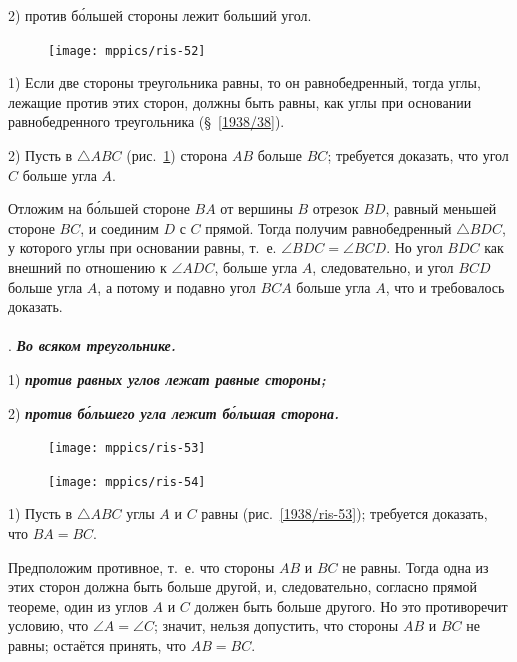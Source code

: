 \documentclass[oneside]{book}
\begin{document}
2) против б\'{о}льшей стороны лежит больший угол.


\begin{figure}
\centering
\texttt{[image: mppics/ris-52]}
\caption{}\label{1938/ris-52}
\end{figure}

1) Если две стороны треугольника равны, то он равнобедренный, тогда углы, лежащие против этих сторон, должны быть равны, как углы при основании равнобедренного треугольника (§~\ref{1938/38}).

2) Пусть в $\triangle ABC$ (рис.~\ref{1938/ris-52}) сторона $AB$ больше $BC$;
требуется доказать, что угол $C$ больше угла $A$.



Отложим на б\'{о}льшей стороне $BA$ от вершины $B$ отрезок $BD$, равный меньшей стороне $BC$, и соединим $D$ с $C$ прямой.
Тогда получим равнобедренный $\triangle BDC$, у которого углы при основании равны, т.~е. $\angle BDC=\angle BCD$.
Но угол $BDC$ как внешний по отношению к $\angle ADC$, больше угла $A$, следовательно, и угол $BCD$ больше угла $A$, а потому и подавно угол $BCA$ больше угла $A$, что и требовалось доказать.

\paragraph{}\label{1938/47}
.
\textbf{\emph{Во всяком треугольнике.}}

1) \textbf{\emph{против равных углов лежат равные стороны;}}

2) \textbf{\emph{против б\'{о}льшего угла лежит б\'{о}льшая сторона.}}

\begin{figure}
\centering
\texttt{[image: mppics/ris-53]}
\caption{}\label{1938/ris-53}
\bigskip
\texttt{[image: mppics/ris-54]}
\caption{}\label{1938/ris-54}
\end{figure}

1) Пусть в $\triangle ABC$ углы $A$ и $C$ равны (рис.~\ref{1938/ris-53});
требуется доказать, что $BA = BC$.

Предположим противное, т.~е. что стороны $AB$ и $BC$ не равны.
Тогда одна из этих сторон должна быть больше другой, и, следовательно, согласно прямой теореме, один из углов $A$ и $C$ должен быть больше другого.
Но это противоречит условию, что $\angle A = \angle C$;
значит, нельзя допустить, что стороны $AB$ и $BC$ не равны;
остаётся принять, что $AB=BC$.
\end{document}
